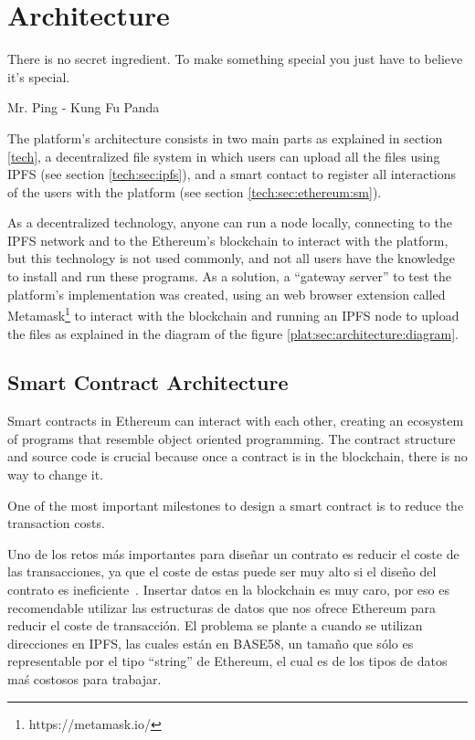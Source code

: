 
\chapter{Architecture}

\begin{FraseCelebre}
  \begin{Frase}
    There is no secret ingredient. To make something special you just have to
    believe it's special.
  \end{Frase}
  \begin{Fuente}
    Mr. Ping - Kung Fu Panda
  \end{Fuente}
\end{FraseCelebre}

The platform's architecture consists in two main parts as explained in section
\ref{tech}, a decentralized file system in which users can upload all the files
using IPFS (see section \ref{tech:sec:ipfs}), and a smart contact to register
all interactions of the users with the platform (see section
\ref{tech:sec:ethereum:sm}).

As a decentralized technology, anyone can run a node locally, connecting to the
IPFS network and to the Ethereum's blockchain to interact with the platform, but
this technology is not used commonly, and not all users have the knowledge to
install and run these programs. As a solution, a ``gateway server'' to test the
platform's implementation was created, using an web browser extension called
Metamask\footnote[1]{https://metamask.io/} to interact with the blockchain and
running an IPFS node to upload the files as explained in the diagram of the
figure \ref{plat:sec:architecture:diagram}.


\section{Smart Contract Architecture}
\label{arch:sca}
Smart contracts in Ethereum can interact with each other, creating an ecosystem
of programs that resemble object oriented programming. The contract structure
and source code is crucial because once a contract is in the blockchain, there
is no way to change it.

One of the most important milestones to design a smart contract is to reduce the
transaction costs.

Uno de los retos más importantes para diseñar un contrato es reducir el coste de
las transacciones, ya que el coste de estas puede ser muy alto si el diseño del
contrato es ineficiente~\cite{croman2016scaling}. Insertar datos en la
blockchain es muy caro, por eso es recomendable utilizar las estructuras de
datos que nos ofrece Ethereum para reducir el coste de transacción. El problema
se plante a cuando se utilizan direcciones en IPFS, las cuales están en BASE58,
un tamaño que sólo es representable por el tipo ``string'' de Ethereum, el cual
es de los tipos de datos maś costosos para trabajar.

